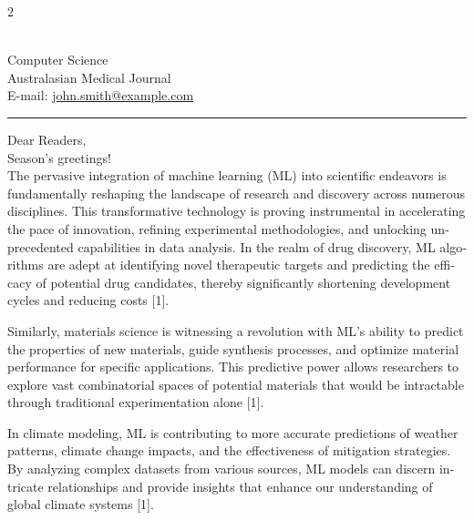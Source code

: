 \documentclass{article}
\renewcommand{\familydefault}{\sfdefault}
\begin{document}
\begin{multicols*}{2}
\sloppy
\raggedcolumns
\setlength{\parindent}{0pt}
\setlength{\parskip}{0pt}
\fontsize{10}{12}\sffamily\color{color_29791}
\par
\vspace*{-5pt}
{\setlength{\leftskip}{8pt}
\\[0.3em]
Computer Science\\
Australasian Medical Journal\\
E-mail: \textcolor{color_33106}{\href{mailto:john.smith@example.com}{john.smith@example.com}}\par}

\noindent\rule{\linewidth}{2.2pt}
\vspace*{-7pt}

\begin{otherlanguage}{english}
\noindent Dear Readers,\\[1em]  
\noindent Season's greetings!\\[1em]
\noindent The pervasive integration of machine learning (ML) into scientific endeavors is fundamentally reshaping the landscape of research and discovery across numerous disciplines. This transformative technology is proving instrumental in accelerating the pace of innovation, refining experimental methodologies, and unlocking unprecedented capabilities in data analysis. In the realm of drug discovery, ML algorithms are adept at identifying novel therapeutic targets and predicting the efficacy of potential drug candidates, thereby significantly shortening development cycles and reducing costs [1].

Similarly, materials science is witnessing a revolution with ML's ability to predict the properties of new materials, guide synthesis processes, and optimize material performance for specific applications. This predictive power allows researchers to explore vast combinatorial spaces of potential materials that would be intractable through traditional experimentation alone [1].

In climate modeling, ML is contributing to more accurate predictions of weather patterns, climate change impacts, and the effectiveness of mitigation strategies. By analyzing complex datasets from various sources, ML models can discern intricate relationships and provide insights that enhance our understanding of global climate systems [1].


\end{otherlanguage}
\end{multicols*}
\end{document}
